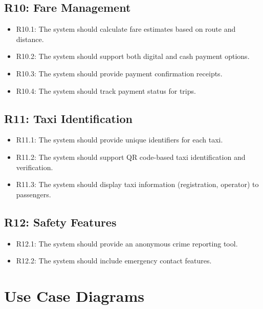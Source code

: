 \documentclass[a4paper,12pt]{article}
\begin{document}
\subsection*{R10: Fare Management}
\begin{itemize}
    \item R10.1: The system should calculate fare estimates based on route and distance.
    \item R10.2: The system should support both digital and cash payment options.
    \item R10.3: The system should provide payment confirmation receipts.
    \item R10.4: The system should track payment status for trips.
\end{itemize}

\subsection*{R11: Taxi Identification}
\begin{itemize}
    \item R11.1: The system should provide unique identifiers for each taxi.
    \item R11.2: The system should support QR code-based taxi identification and verification.
    \item R11.3: The system should display taxi information (registration, operator) to passengers.
\end{itemize}

\subsection*{R12: Safety Features}
\begin{itemize}
    \item R12.1: The system should provide an anonymous crime reporting tool.
    \item R12.2: The system should include emergency contact features.
\end{itemize}

\section{Use Case Diagrams}
\end{document}
